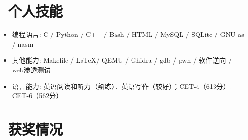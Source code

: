 \documentclass{resume}
\begin{document}
\section{\faCogs\ 个人技能}
\begin{itemize}[parsep=0.5ex]
  \item 编程语言: C / Python / C++ / Bash / HTML / MySQL / SQLite / GNU as / nasm 
  \item 其他能力: Makefile / \LaTeX / QEMU / Ghidra / gdb / pwn / 软件逆向 / web渗透测试
  \item 语言能力: 英语阅读和听力（熟练），英语写作（较好）；CET-4（613分）, CET-6（562分）
\end{itemize}

\section{\faTrophy\ 获奖情况}

%
%
\end{document}
